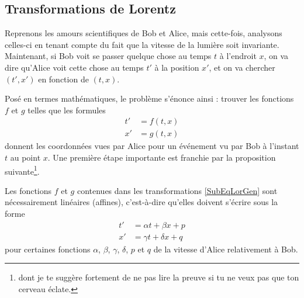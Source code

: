 \subsection{Transformations de Lorentz}

Reprenons les amours scientifiques de Bob et Alice, mais cette-fois, analysons celles-ci en tenant compte du fait que la vitesse de la lumière soit invariante. Maintenant, si Bob voit se passer quelque chose au temps \( t\) à l'endroit \( x\), on va dire qu'Alice voit cette chose au temps \( t'\) à la position \( x'\), et on va chercher \( (t',x')\) en fonction de \( (t,x)\).

Posé en termes mathématiques, le problème s'énonce ainsi : trouver les fonctions \( f\) et \( g\) telles que les formules
\begin{subequations}	\label{SubEqLorGen}
	\begin{align}
		t' & =f(t,x) \\
		x' & =g(t,x)
	\end{align}
\end{subequations}
donnent les coordonnées vues par Alice pour un événement vu par Bob à l'instant \( t\) au point \( x\). Une première étape importante est franchie par la proposition suivante\footnote{dont je te suggère fortement de ne pas lire la preuve si tu ne veux pas que ton cerveau éclate.}.

\begin{proposition}
	Les fonctions \( f\) et \( g\) contenues dans les transformations \eqref{SubEqLorGen} sont nécessairement linéaires (affines), c'est-à-dire qu'elles doivent s'écrire sous la forme
	\[
		\begin{split}
			t'&=\alpha t+\beta x+p	\\
			x'&=\gamma t+\delta x+q
		\end{split}
	\]
	pour certaines fonctions \( \alpha\), \( \beta\), \( \gamma\), \( \delta\), \( p\) et \( q\) de la vitesse d'Alice relativement à Bob.
\end{proposition}

